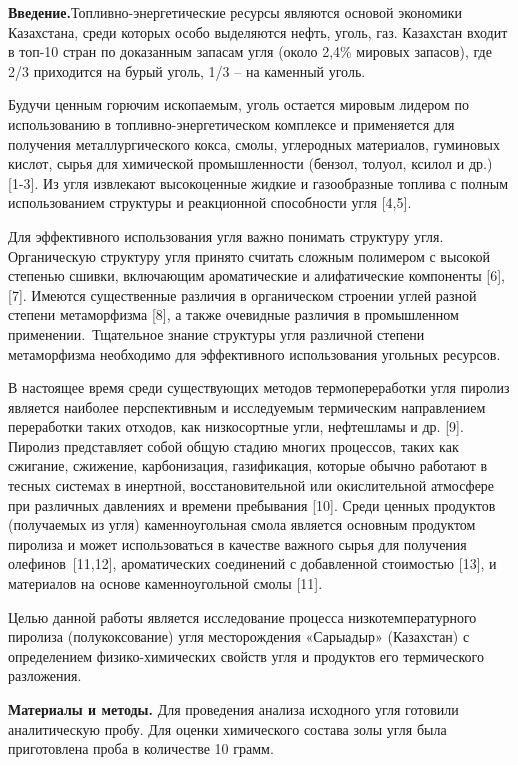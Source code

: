 \begin{multicols}{2}
{\bfseries Введение.}Топливно-энергетические ресурсы являются основой
экономики Казахстана, среди которых особо выделяются нефть, уголь, газ.
Казахстан входит в топ-10 стран по доказанным запасам угля (около 2,4\%
мировых запасов), где 2/3 приходится на бурый уголь, 1/3 -- на каменный
уголь.

Будучи ценным горючим ископаемым, уголь остается мировым лидером по
использованию в топливно-энергетическом комплексе и применяется для
получения металлургического кокса, смолы, углеродных материалов,
гуминовых кислот, сырья для химической промышленности (бензол, толуол,
ксилол и др.) {[}1-3{]}. Из угля извлекают высокоценные жидкие и
газообразные топлива с полным использованием структуры и реакционной
способности угля {[}4,5{]}.~

Для эффективного использования угля важно понимать структуру угля.
Органическую структуру угля принято считать сложным полимером с высокой
степенью сшивки, включающим ароматические и алифатические компоненты
{[}6{]}, {[}7{]}. Имеются существенные различия в органическом строении
углей разной степени метаморфизма {[}8{]}, а также очевидные различия в
промышленном применении.~Тщательное знание структуры угля различной
степени метаморфизма необходимо для эффективного использования угольных
ресурсов.

В настоящее время среди существующих методов термопереработки угля
пиролиз является наиболее перспективным и исследуемым термическим
направлением переработки таких отходов, как низкосортные угли,
нефтешламы и др. {[}9{]}. Пиролиз представляет собой общую стадию многих
процессов, таких как сжигание, сжижение, карбонизация, газификация,
которые обычно работают в тесных системах в инертной, восстановительной
или окислительной атмосфере при различных давлениях и времени пребывания
{[}10{]}. Среди ценных продуктов (получаемых из угля) каменноугольная
смола является основным продуктом пиролиза и может использоваться в
качестве важного сырья для получения олефинов~{[}11,12{]}, ароматических
соединений с добавленной стоимостью {[}13{]}, и материалов на основе
каменноугольной смолы {[}11{]}.~

Целью данной работы является исследование процесса низкотемпературного
пиролиза (полукоксование) угля месторождения «Сарыадыр» (Казахстан) с
определением физико-химических свойств угля и продуктов его термического
разложения.

{\bfseries Материалы и методы.} Для проведения анализа исходного угля
готовили аналитическую пробу. Для оценки химического состава золы угля
была приготовлена проба в количестве 10 грамм.


\end{multicols}
